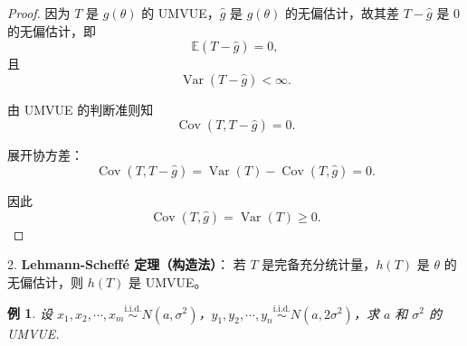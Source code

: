 \documentclass[a4paper]{ctexart}
\newtheorem{example}{例}[section]
\begin{document}
\begin{proof}
    因为 \( T \) 是 \( g(\theta) \) 的 UMVUE，\( \hat{g} \) 是 \( g(\theta) \) 的无偏估计，故其差 \( T - \hat{g} \) 是 \( 0 \) 的无偏估计，即
    \begin{equation}
    \mathbb{E}(T - \hat{g}) = 0,
    \end{equation}
    且
    \begin{equation}
    \operatorname{Var}(T - \hat{g}) < \infty.
    \end{equation}

    由 UMVUE 的判断准则知
    \begin{equation}
    \operatorname{Cov}(T, T - \hat{g}) = 0.
    \end{equation}

    展开协方差：
    \begin{equation}
    \operatorname{Cov}(T, T - \hat{g}) = \operatorname{Var}(T) - \operatorname{Cov}(T, \hat{g}) = 0.
    \end{equation}

    因此
    \begin{equation}
    \operatorname{Cov}(T, \hat{g}) = \operatorname{Var}(T) \geq 0.
    \end{equation}
\end{proof}

2. \textbf{Lehmann-Scheffé 定理（构造法）}：
   若 \(T\) 是完备充分统计量，\(h(T)\) 是 \(\theta\) 的无偏估计，则 \(h(T)\) 是 UMVUE。

\begin{example}
    设 \(x_1, x_2, \cdots, x_m \stackrel{\text{i.i.d.}}{\sim} N(a, \sigma^2)\)，\(y_1, y_2, \cdots, y_n \stackrel{\text{i.i.d.}}{\sim} N(a, 2\sigma^2)\)，求 \(a\) 和 \(\sigma^2\) 的 UMVUE.
\end{example}
\end{document}
